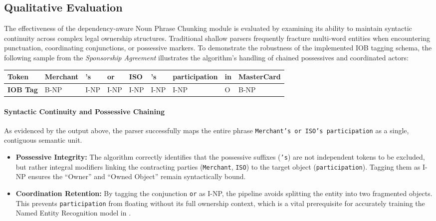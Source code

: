 \documentclass[twoside,final]{hcmut-report}
\newcommand{\result}[1]{\fcolorbox{red}{white}{#1}}
\begin{document}
\subsection{Qualitative Evaluation}
The effectiveness of the dependency-aware Noun Phrase Chunking module is evaluated by examining its ability to maintain syntactic continuity across complex legal ownership structures. Traditional shallow parsers frequently fracture multi-word entities when encountering punctuation, coordinating conjunctions, or possessive markers. To demonstrate the robustness of the implemented IOB tagging schema, the following sample from the \textit{Sponsorship Agreement} illustrates the algorithm's handling of chained possessives and coordinated actors:
\begin{center}
  \small
  \begin{tabular}{l|llllllll}
    \textbf{Token}   & Merchant & 's   & or   & ISO  & 's   & participation & in & MasterCard \\
    \hline
    \textbf{IOB Tag} & B-NP     & I-NP & I-NP & I-NP & I-NP & I-NP          & O  & B-NP       \\
  \end{tabular}
\end{center}
\paragraph{Syntactic Continuity and Possessive Chaining}
As evidenced by the output above, the parser successfully maps the entire phrase \texttt{Merchant's or ISO's participation} as a single, contiguous semantic unit.

\begin{itemize}[topsep=1pt, itemsep=0pt, parsep=2pt]
  \item \textbf{Possessive Integrity:} The algorithm correctly identifies that the possessive suffixes (\texttt{'s}) are not independent tokens to be excluded, but rather integral modifiers linking the contracting parties (\texttt{Merchant}, \texttt{ISO}) to the target object (\texttt{participation}). Tagging them as I-NP ensures the ``Owner'' and ``Owned Object'' remain syntactically bound.
  \item \textbf{Coordination Retention:} By tagging the conjunction \texttt{or} as I-NP, the pipeline avoids splitting the entity into two fragmented objects. This prevents \texttt{participation} from floating without its full ownership context, which is a vital prerequisite for accurately training the Named Entity Recognition model in \result{Section~\ref{task_2.1}}.
\end{itemize}
\end{document}
